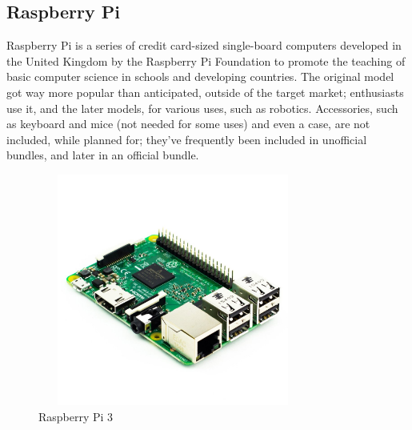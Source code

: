 \subsection{Raspberry Pi} Raspberry Pi is a series of credit card-sized single-board computers developed in the United Kingdom by the Raspberry Pi Foundation to promote the teaching of basic computer science in schools and developing countries. The original model got way more popular than anticipated, outside of the target market; enthusiasts use it, and the later models, for various uses, such as robotics. Accessories, such as keyboard and mice (not needed for some uses) and even a case, are not included, while planned for; they've frequently been included in unofficial bundles, and later in an official bundle.
\begin{figure}[ht]
        \centering
        \includegraphics[width=3.5in, height=3in]{images/raspberry_pi.png}
        \caption{Raspberry Pi 3}
\end{figure}
